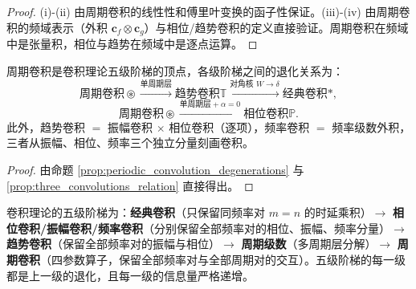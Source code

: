 \begin{proof}
(i)-(ii) 由周期卷积的线性性和傅里叶变换的函子性保证。(iii)-(iv) 由周期卷积的频域表示（外积 $\mathbf{c}_f \otimes \mathbf{c}_g$）与相位/趋势卷积的定义直接验证。周期卷积在频域中是张量积，相位与趋势在频域中是逐点运算。
\end{proof}

\begin{proposition}[周期卷积与四类经典卷积的关系]\label{prop:periodic_convolution_hierarchy}
周期卷积是卷积理论五级阶梯的顶点，各级阶梯之间的退化关系为：
\[
\text{周期卷积} \circledast \xrightarrow{\text{单周期层}} \text{趋势卷积} \mathbb{T} \xrightarrow{\text{对角核 } W \to \delta} \text{经典卷积} *,
\]
\[
\text{周期卷积} \circledast \xrightarrow{\text{单周期层} + \alpha = 0} \text{相位卷积} \mathbb{P}.
\]
此外，趋势卷积 $=$ 振幅卷积 $\times$ 相位卷积（逐项），频率卷积 $=$ 频率级数外积，三者从振幅、相位、频率三个独立分量刻画卷积。
\end{proposition}

\begin{proof}
由命题 \ref{prop:periodic_convolution_degenerations} 与 \ref{prop:three_convolutions_relation} 直接得出。
\end{proof}

\begin{remark}[五级阶梯的完整谱系]\label{rem:five_stage_hierarchy}
卷积理论的五级阶梯为：\textbf{经典卷积}（只保留同频率对 $m = n$ 的时延乘积）$\to$ \textbf{相位卷积/振幅卷积/频率卷积}（分别保留全部频率对的相位、振幅、频率分量）$\to$ \textbf{趋势卷积}（保留全部频率对的振幅与相位）$\to$ \textbf{周期级数}（多周期层分解）$\to$ \textbf{周期卷积}（四参数算子，保留全部频率对与全部周期对的交互）。五级阶梯的每一级都是上一级的退化，且每一级的信息量严格递增。
\end{remark}

